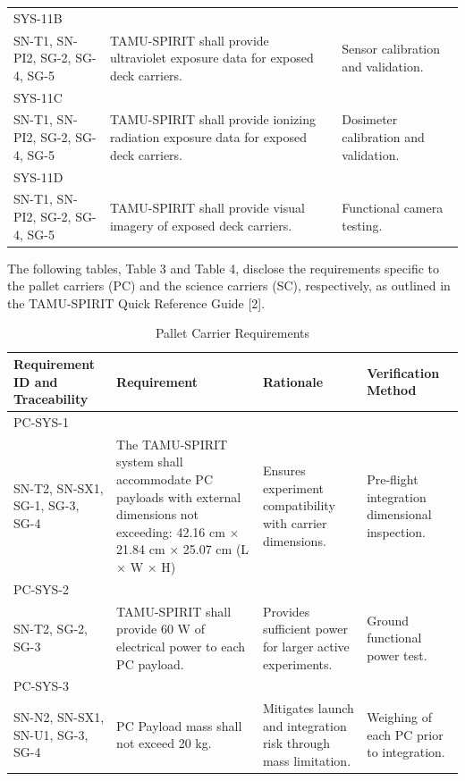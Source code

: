 \documentclass[conf]{new-aiaa}
\begin{document}
{\begin{longtable}{@{}p{2.2cm}p{4.1cm}p{4.1cm}p{4.1cm}@{}}
SYS-11B\\SN-T1, SN-PI2, SG-2, SG-4, SG-5 &
TAMU-SPIRIT shall provide ultraviolet exposure data for exposed deck carriers. &
 &
Sensor calibration and validation. \\ \hline

SYS-11C\\SN-T1, SN-PI2, SG-2, SG-4, SG-5 &
TAMU-SPIRIT shall provide ionizing radiation exposure data for exposed deck carriers. &
 &
Dosimeter calibration and validation. \\ \hline

SYS-11D\\SN-T1, SN-PI2, SG-2, SG-4, SG-5 &
TAMU-SPIRIT shall provide visual imagery of exposed deck carriers. &
 &
Functional camera testing. \\
\end{longtable}
}

The following tables, Table 3 and Table 4, disclose the requirements specific to the pallet carriers (PC) and the science carriers (SC), respectively, as outlined in the TAMU-SPIRIT Quick Reference Guide [2]. \cite{tamuSpiritQRGv3_2025}

\begin{table}[!htbp]
    \centering
    \footnotesize
    \setlength{\tabcolsep}{4pt}
    \renewcommand{\arraystretch}{1.15}
    \begin{tabularx}{\textwidth}{@{}>{\raggedright\arraybackslash}m{2.2cm}YYY@{}}
    \toprule
    \textbf{Requirement ID and Traceability} & \textbf{Requirement} & \textbf{Rationale} & \textbf{Verification Method} \\
    \midrule
    PC-SYS-1\\SN-T2, SN-SX1, SG-1, SG-3, SG-4 &
    The TAMU-SPIRIT system shall accommodate PC payloads with external dimensions not exceeding: 42.16 cm $\times$ 21.84 cm $\times$ 25.07 cm (L $\times$ W $\times$ H) &
    Ensures experiment compatibility with carrier dimensions. &
    Pre-flight integration dimensional inspection. \\ \hline

    PC-SYS-2\\SN-T2, SG-2, SG-3 &
    TAMU-SPIRIT shall provide 60 W of electrical power to each PC payload. &
    Provides sufficient power for larger active experiments. &
    Ground functional power test. \\ \hline

    PC-SYS-3\\SN-N2, SN-SX1, SN-U1, SG-3, SG-4 &
    PC Payload mass shall not exceed 20 kg. &
    Mitigates launch and integration risk through mass limitation. &
    Weighing of each PC prior to integration. \\
    \bottomrule
    \end{tabularx}
    \caption{Pallet Carrier Requirements}
    \label{tab:pc_requirements}
\end{table}
\end{document}
